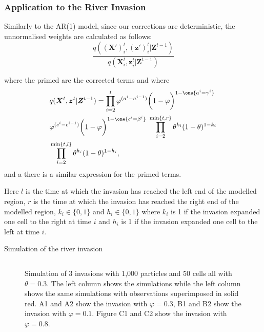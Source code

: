 \documentclass[9pt, xcolor={dvipsnames,svgnames,table}]{beamer}
\begin{document}
\begin{frame}
\frametitle{Application to the River Invasion}

Similarly to the AR(1) model, since our corrections are deterministic, the unnormalised weights are calculated as follows:
\begin{equation*}
    \frac{q(\bm{(X')}^{t}_i,\bm{(z')}^{t}_i | \bm{Z}^{t-1})}{q(\bm{X}^{t}_i,\bm{z}^{t}_i | \bm{Z}^{t-1})}
\end{equation*}

where the primed are the corrected terms and where
\begin{align*}
    & q(\bm{X}^{t},\bm{z}^{t} | \bm{Z}^{t-1}) =  \prod_{i=2}^{t} \varphi^{(a^{i} - a^{i-1})}\bigg(1 - \varphi \bigg)^{1-\one {a^i=\gamma^i}} \nonumber \\
    & \varphi^{(c^{i} - c^{i-1})} \bigg(1 - \varphi\bigg)^{1-\one {c^i=\beta^i}} \; \prod_{i=2}^{\min\{t,r\}} \theta^{k_i} (1-\theta)^{1-k_i}  \label{eq:4} \\ 
    & \prod_{i=2}^{\min\{t,l\}} \theta^{h_i} (1-\theta)^{1-h_i} \nonumber,
\end{align*}
and a there is a similar expression for the primed terms.

Here $l$ is the time at which the invasion has reached the left end of the modelled region, $r$ is the time at which the invasion has reached the right end of the modelled region, $k_i \in \{0,1\}$ and $h_i \in \{0,1\}$ where $k_i$ is 1 if the invasion expanded one cell to the right at time $i$ and $h_i$ is 1 if the invasion expanded one cell to the left at time $i$.

\end{frame}


\begin{frame}{Simulation of the river invasion}
    \begin{figure}
        \begin{columns}
            Simulation of 3 invasions with 1,000 particles and 50 cells all with $\theta = 0.3$. The left column shows the simulations while the left column shows the same simulations with observations superimposed in solid red. A1 and A2 show the invasion with $\varphi = 0.3$, B1 and B2 show the invasion with $\varphi = 0.1$. Figure C1 and C2 show the invasion with $\varphi = 0.8$.
            \label{fig:2}
        \end{columns}
    \end{figure}
\end{frame}
\end{document}

